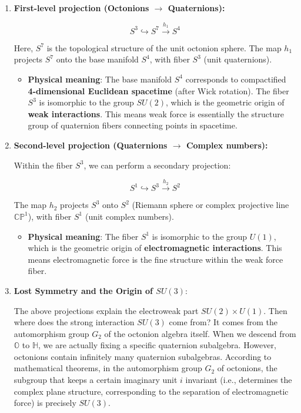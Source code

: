 \begin{enumerate}
\item \textbf{First-level projection (Octonions $\to$ Quaternions):}

\[S^3 \hookrightarrow S^7 \xrightarrow{h_1} S^4\]

Here, $S^7$ is the topological structure of the unit octonion sphere. The map $h_1$ projects $S^7$ onto the base manifold $S^4$, with fiber $S^3$ (unit quaternions).

\begin{itemize}
\item \textbf{Physical meaning}: The base manifold $S^4$ corresponds to compactified \textbf{4-dimensional Euclidean spacetime} (after Wick rotation). The fiber $S^3$ is isomorphic to the group $SU(2)$, which is the geometric origin of \textbf{weak interactions}. This means weak force is essentially the structure group of quaternion fibers connecting points in spacetime.
\end{itemize}

\item \textbf{Second-level projection (Quaternions $\to$ Complex numbers):}

Within the fiber $S^3$, we can perform a secondary projection:

\[S^1 \hookrightarrow S^3 \xrightarrow{h_2} S^2\]

The map $h_2$ projects $S^3$ onto $S^2$ (Riemann sphere or complex projective line $\mathbb{CP}^1$), with fiber $S^1$ (unit complex numbers).

\begin{itemize}
\item \textbf{Physical meaning}: The fiber $S^1$ is isomorphic to the group $U(1)$, which is the geometric origin of \textbf{electromagnetic interactions}. This means electromagnetic force is the fine structure within the weak force fiber.
\end{itemize}

\item \textbf{Lost Symmetry and the Origin of $SU(3)$}:

The above projections explain the electroweak part $SU(2) \times U(1)$. Then where does the strong interaction $SU(3)$ come from?
It comes from the automorphism group $G_2$ of the octonion algebra itself. When we descend from $\mathbb{O}$ to $\mathbb{H}$, we are actually fixing a specific quaternion subalgebra. However, octonions contain infinitely many quaternion subalgebras.
According to mathematical theorems, in the automorphism group $G_2$ of octonions, the subgroup that keeps a certain imaginary unit $i$ invariant (i.e., determines the complex plane structure, corresponding to the separation of electromagnetic force) is precisely \textbf{$SU(3)$}.


\end{enumerate}
